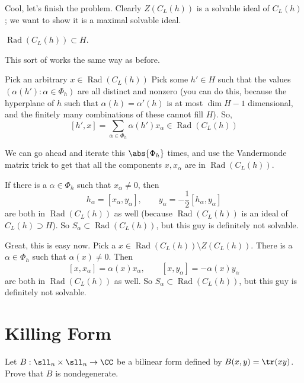 \documentclass[11pt, headheight=30pt]{scrartcl}
\DeclareMathOperator{\Rad}{Rad}
\begin{document}
Cool, let's finish the problem.
Clearly $Z(C_L(h))$ is a solvable ideal of $C_L(h)$;
we want to show it is a maximal solvable ideal.

\begin{claim*}
    $\Rad(C_L(h))\subset H$.
\end{claim*}
\begin{psec*}
    This sort of works the same way as before.
    
    Pick an arbitrary $x\in \Rad(C_L(h))$ %
    Pick some $h'\in H$ such that the values $(\alpha(h'): \alpha\in \Phi_h)$
    are all distinct and nonzero (you can do this, because the hyperplane of $h$
    such that $\alpha(h) = \alpha'(h)$ is at most $\dim H -1$ dimensional, and the finitely
    many combinations of these cannot fill $H$). So,
    \[
        [h',x] = \sum\limits_{\alpha\in\Phi_h} \alpha(h')x_{\alpha} \in\Rad(C_L(h))
    \]

    We can go ahead and iterate this $\abs{\Phi_h}$ times, and use the Vandermonde matrix trick
    to get that all the components $x, x_{\alpha}$ are in $\Rad(C_L(h))$.
    
    If there is a $\alpha\in\Phi_h$ such that $x_{\alpha}\neq 0$,
    then
    \[
        h_{\alpha} = [x_{\alpha},y_{\alpha}], \qquad y_{\alpha} = -\frac12[h_{\alpha}, y_{\alpha}]
    \]
    are both in $\Rad(C_L(h))$ as well (because $\Rad(C_L(h))$ is an ideal of $C_L(h)\supset H$).
    So $S_\alpha\subset \Rad(C_L(h))$, but this guy is definitely not solvable.
\end{psec*}

Great, this is easy now. Pick a $x \in \Rad(C_L(h))\setminus Z(C_L(h))$.
There is a $\alpha\in\Phi_h$ such that $\alpha(x) \neq 0$. Then
\[
    [x,x_{\alpha}] = \alpha(x)x_{\alpha}, \qquad [x, y_{\alpha}] = -\alpha(x)y_{\alpha}
\]
are both in $\Rad(C_L(h))$ as well. So $S_{\alpha}\subset \Rad(C_L(h))$,
but this guy is definitely not solvable.

\section{Killing Form}
\begin{prob}
    Let $B : \sll_n \times \sll_n \to \CC$ be a bilinear form defined by $B(x, y) = \tr(xy)$.
    Prove that $B$ is nondegenerate.
\end{prob}
\end{document}
